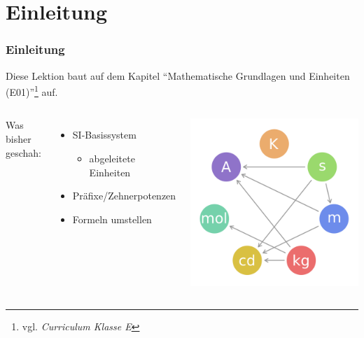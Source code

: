 

\subtitle{Technik Klasse A 01: \\
  Mathematische Grundkenntnisse \\[2em]}
\date{Stand 09.01.2017}


\section{Einleitung}

\begin{frame}
  \frametitle{Einleitung}

  Diese Lektion baut auf dem Kapitel ``Mathematische Grundlagen und Einheiten
  (E01)''\footnote{vgl. \emph{Curriculum Klasse E}\hyperlink{refs}{\cite{curr}}} auf.

  \begin{columns}[c]
    \column[c]{5cm}
    Was bisher geschah: \\[1em]
    \begin{itemize}
      \item SI-Basissystem
        \begin{itemize}
          \item abgeleitete Einheiten
        \end{itemize}
      \item Präfixe/Zehnerpotenzen
      \item Formeln umstellen
    \end{itemize}
    \column{5cm}
    \begin{center}
      \includegraphics[width=1\textwidth]{e01/SI_base_unit.png}
      \tiny \hyperlink{refs}{\cite{wc}}
    \end{center}
  \end{columns}


\end{frame}

